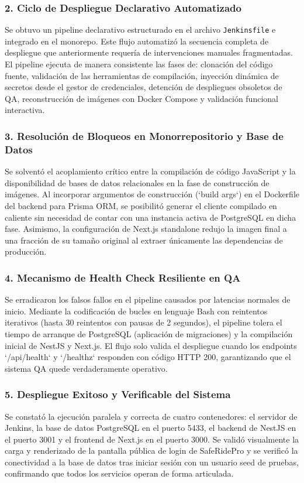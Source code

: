 \documentclass{article}
\begin{document}
\subsubsection*{2. Ciclo de Despliegue Declarativo Automatizado}
Se obtuvo un pipeline declarativo estructurado en el archivo \texttt{Jenkinsfile} e integrado en el monorepo. Este flujo automatizó la secuencia completa de despliegue que anteriormente requería de intervenciones manuales fragmentadas. El pipeline ejecuta de manera consistente las fases de: clonación del código fuente, validación de las herramientas de compilación, inyección dinámica de secretos desde el gestor de credenciales, detención de despliegues obsoletos de QA, reconstrucción de imágenes con Docker Compose y validación funcional interactiva.

\subsubsection*{3. Resolución de Bloqueos en Monorrepositorio y Base de Datos}
Se solventó el acoplamiento crítico entre la compilación de código JavaScript y la disponibilidad de bases de datos relacionales en la fase de construcción de imágenes. Al incorporar argumentos de construcción (`build args`) en el Dockerfile del backend para Prisma ORM, se posibilitó generar el cliente compilado en caliente sin necesidad de contar con una instancia activa de PostgreSQL en dicha fase. Asimismo, la configuración de Next.js standalone redujo la imagen final a una fracción de su tamaño original al extraer únicamente las dependencias de producción.

\subsubsection*{4. Mecanismo de Health Check Resiliente en QA}
Se erradicaron los falsos fallos en el pipeline causados por latencias normales de inicio. Mediante la codificación de bucles en lenguaje Bash con reintentos iterativos (hasta 30 reintentos con pausas de 2 segundos), el pipeline tolera el tiempo de arranque de PostgreSQL (aplicación de migraciones) y la compilación inicial de NestJS y Next.js. El flujo solo valida el despliegue cuando los endpoints `/api/health` y `/healthz` responden con código HTTP 200, garantizando que el sistema QA quede verdaderamente operativo.

\subsubsection*{5. Despliegue Exitoso y Verificable del Sistema}
Se constató la ejecución paralela y correcta de cuatro contenedores: el servidor de Jenkins, la base de datos PostgreSQL en el puerto 5433, el backend de NestJS en el puerto 3001 y el frontend de Next.js en el puerto 3000. Se validó visualmente la carga y renderizado de la pantalla pública de login de SafeRidePro y se verificó la conectividad a la base de datos tras iniciar sesión con un usuario seed de pruebas, confirmando que todos los servicios operan de forma articulada.
\end{document}

